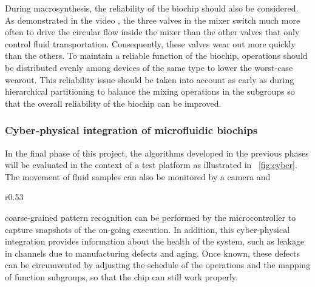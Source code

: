During macrosynthesis, the reliability of the biochip should also be
considered. As demonstrated in the video \cite{mixing_store}, 
the three valves in the mixer switch %
much more often
to drive the circular flow inside the mixer than the other valves 
that only control fluid transportation.
Consequently, these valves wear out more quickly than the others.  
To maintain a reliable function of the biochip, operations should be
distributed evenly among devices of the same type to lower the 
worst-case wearout. This reliability issue should be taken into account as
early as during hierarchical partitioning to balance the mixing operations in the
subgroups so that the overall reliability of the biochip can be improved.


\subsubsection{Cyber-physical integration of microfluidic biochips}

In the final phase of this project, the algorithms 
developed in the previous
phases will be
evaluated in the context of a test platform as illustrated in
\figname~\ref{fig:cyber}. 
 The movement of
fluid samples can also be monitored by a camera and 
%
\begin{wrapfigure}[17]{r}{0.53\textwidth}
{
\figurefontsize
\centering

\caption{Integration of a synthesized biochip in a cyber-physical system.} 
\label{fig:cyber}
}
\end{wrapfigure}
%
coarse-grained 
pattern
recognition can be performed by the microcontroller to capture 
snapshots of the on-going execution. In addition, this cyber-physical
integration provides information about the health of the system, such as
leakage in channels due to manufacturing defects and aging. 
Once known, these defects can be 
circumvented 
by adjusting the schedule of the operations and the mapping of function
subgroups, so that the chip can still work properly. 


